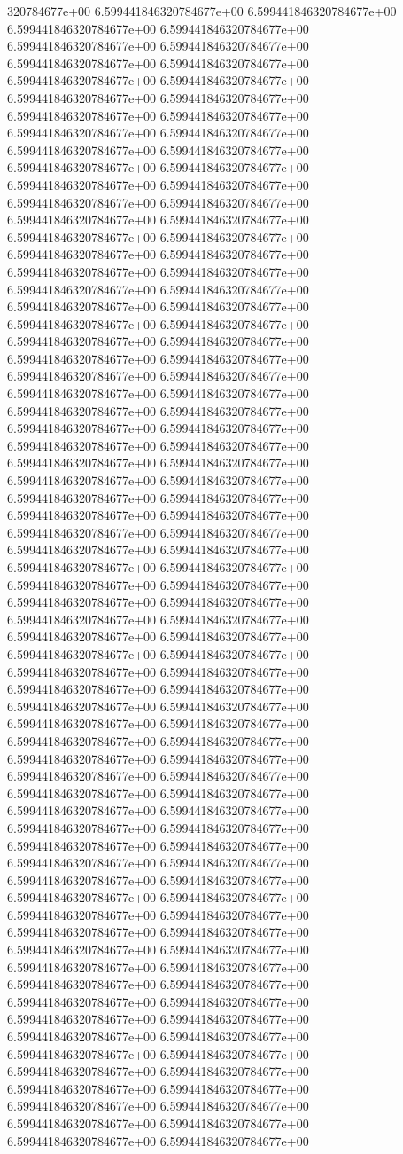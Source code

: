 320784677e+00	6.599441846320784677e+00	6.599441846320784677e+00	6.599441846320784677e+00	6.599441846320784677e+00	6.599441846320784677e+00	6.599441846320784677e+00	6.599441846320784677e+00	6.599441846320784677e+00	6.599441846320784677e+00	6.599441846320784677e+00	6.599441846320784677e+00	6.599441846320784677e+00	6.599441846320784677e+00	6.599441846320784677e+00	6.599441846320784677e+00	6.599441846320784677e+00	6.599441846320784677e+00	6.599441846320784677e+00	6.599441846320784677e+00	6.599441846320784677e+00	6.599441846320784677e+00	6.599441846320784677e+00	6.599441846320784677e+00	6.599441846320784677e+00	6.599441846320784677e+00	6.599441846320784677e+00	6.599441846320784677e+00	6.599441846320784677e+00	6.599441846320784677e+00	6.599441846320784677e+00	6.599441846320784677e+00	6.599441846320784677e+00	6.599441846320784677e+00	6.599441846320784677e+00	6.599441846320784677e+00	6.599441846320784677e+00	6.599441846320784677e+00	6.599441846320784677e+00	6.599441846320784677e+00	6.599441846320784677e+00	6.599441846320784677e+00	6.599441846320784677e+00	6.599441846320784677e+00	6.599441846320784677e+00	6.599441846320784677e+00	6.599441846320784677e+00	6.599441846320784677e+00	6.599441846320784677e+00	6.599441846320784677e+00	6.599441846320784677e+00	6.599441846320784677e+00	6.599441846320784677e+00	6.599441846320784677e+00	6.599441846320784677e+00	6.599441846320784677e+00	6.599441846320784677e+00	6.599441846320784677e+00	6.599441846320784677e+00	6.599441846320784677e+00	6.599441846320784677e+00	6.599441846320784677e+00	6.599441846320784677e+00	6.599441846320784677e+00	6.599441846320784677e+00	6.599441846320784677e+00	6.599441846320784677e+00	6.599441846320784677e+00	6.599441846320784677e+00	6.599441846320784677e+00	6.599441846320784677e+00	6.599441846320784677e+00	6.599441846320784677e+00	6.599441846320784677e+00	6.599441846320784677e+00	6.599441846320784677e+00	6.599441846320784677e+00	6.599441846320784677e+00	6.599441846320784677e+00	6.599441846320784677e+00	6.599441846320784677e+00	6.599441846320784677e+00	6.599441846320784677e+00	6.599441846320784677e+00	6.599441846320784677e+00	6.599441846320784677e+00	6.599441846320784677e+00	6.599441846320784677e+00	6.599441846320784677e+00	6.599441846320784677e+00	6.599441846320784677e+00	6.599441846320784677e+00	6.599441846320784677e+00	6.599441846320784677e+00	6.599441846320784677e+00	6.599441846320784677e+00	6.599441846320784677e+00	6.599441846320784677e+00	6.599441846320784677e+00	6.599441846320784677e+00	6.599441846320784677e+00	6.599441846320784677e+00	6.599441846320784677e+00	6.599441846320784677e+00	6.599441846320784677e+00	6.599441846320784677e+00	6.599441846320784677e+00	6.599441846320784677e+00	6.599441846320784677e+00	6.599441846320784677e+00	6.599441846320784677e+00	6.599441846320784677e+00	6.599441846320784677e+00	6.599441846320784677e+00	6.599441846320784677e+00	6.599441846320784677e+00	6.599441846320784677e+00	6.599441846320784677e+00	6.599441846320784677e+00	6.599441846320784677e+00	6.599441846320784677e+00	6.599441846320784677e+00	6.599441846320784677e+00	6.599441846320784677e+00	6.599441846320784677e+00	6.599441846320784677e+00	6.599441846320784677e+00	6.599441846320784677e+00	6.599441846320784677e+00	6.599441846320784677e+00	6.599441846320784677e+00	6.599441846320784677e+00	6.599441846320784677e+00
